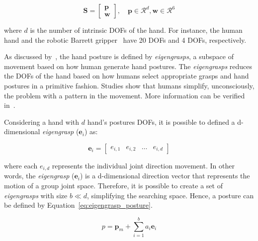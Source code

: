 
\begin{equation}
	\mathbf{S}=\left[\begin{array}{c}
		\mathbf{p} \\
		\mathbf{w}\end{array}\right], \quad \mathbf{p} \in \mathcal{R}^{d}, \mathbf{w} \in \mathcal{R}^{6}
\label{eq:fob_grasp}
\end{equation}

\noindent
where $d$ is the number of intrinsic \acp{DOF} of the hand. For instance, the human hand and the robotic Barrett gripper~\cite{barret_hand} have 20 \acp{DOF} and 4 \acp{DOF}, respectively.

As discussed by~\cite{Ciocarlie2009}, the hand posture is defined by \textit{eigengrasps}, a subspace of movement based on how human generate hand postures. The \textit{eigengrasps} reduces the \acp{DOF} of the hand based on how humans select appropriate grasps and hand postures in a primitive fashion. Studies show that humans simplify, unconsciously, the problem with a pattern in the movement. More information can be verified in~\cite{Ciocarlie2009,Santello2002}. 

Considering a hand with $d$ hand's postures DOFs, it is possible to defined a d-dimensional \textit{eigengrasp} ($\mathbf{e}_i$) as:

\begin{equation}
	\mathbf{e}_{i}=\left[\begin{array}{llll}
		e_{i, 1} & e_{i, 2} & \ldots & e_{i, d}
	\end{array}\right]
\end{equation}

\noindent where each $e_{i,d}$ represents the individual joint direction movement. In other words, the \textit{eigengrasp} ($\mathbf{e}_i$) is a d-dimensional direction vector that represents the motion of a group joint space. Therefore, it is possible to create a set of \textit{eigengrasps} with size $b \ll  d$, simplifying the searching space. Hence, a posture can be defined by Equation~\ref{eq:eigengrasp_posture}.

\begin{equation}
p=\mathbf{p}_m+\sum_{i=1}^{b} a_{i} \mathbf{e}_i
\label{eq:eigengrasp_posture}
\end{equation}


